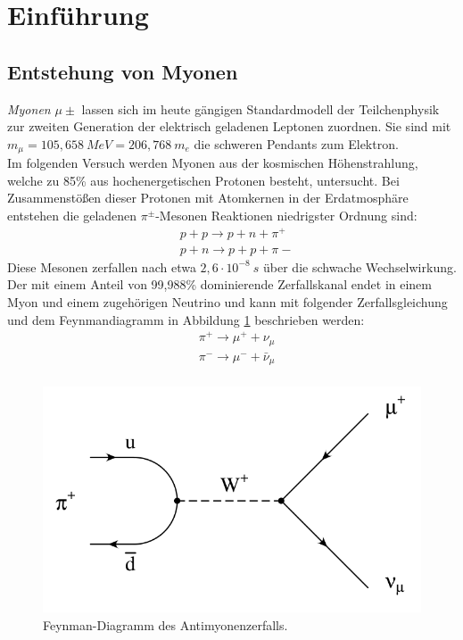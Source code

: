 \section{Einführung}

	\subsection{Entstehung von Myonen}
	\textit{Myonen} $\mu{\pm}$ lassen sich im heute gängigen Standardmodell der Teilchenphysik zur zweiten Generation der elektrisch geladenen Leptonen zuordnen. Sie sind mit $m_\mu = 105,658\ \unit{MeV = 206,768\ m_e}$\cite{pdg} die schweren Pendants zum Elektron.\\
	Im folgenden Versuch werden Myonen aus der kosmischen Höhenstrahlung, welche zu 85\% aus hochenergetischen Protonen besteht, untersucht. Bei Zusammenstößen dieser Protonen mit Atomkernen in der Erdatmosphäre entstehen die geladenen $\pi^\pm$-Mesonen Reaktionen niedrigster Ordnung sind:
		\begin{align*}
			&p + p \longrightarrow p + n + \pi^+\\
			&p + n \longrightarrow p + p + \pi-
		\end{align*}
	Diese Mesonen zerfallen nach etwa $2,6\cdot10^{-8}\ \unit{s}$ über die schwache Wechselwirkung. Der mit einem Anteil von 99,988\% dominierende Zerfallskanal endet in einem Myon und einem zugehörigen Neutrino und kann mit folgender Zerfallsgleichung und dem Feynmandiagramm in Abbildung \ref{fig:pionzerfall} beschrieben werden:
		\begin{align*}
			&\pi^+ \longrightarrow \mu^+ + \nu_\mu\\
			&\pi^- \longrightarrow \mu^- + \bar{\nu}_\mu\\
		\end{align*}
		\begin{figure}[hp]
					\centering
					\includegraphics[width = 0.7\linewidth]{pic/pionzerfall.png}
					\caption{Feynman-Diagramm des Antimyonenzerfalls.}
					\label{fig:pionzerfall}
		\end{figure}
		

